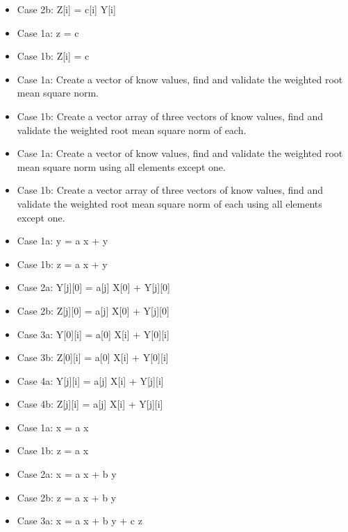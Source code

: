 \begin{itemize}
\item {} Case 2b: Z[i] = c[i] Y[i]
\item {} Case 1a: z = c
\item {} Case 1b: Z[i] = c
\item {} Case 1a: Create a vector of know values, find and validate the weighted root mean square norm.
\item {} Case 1b: Create a vector array of three vectors of know values, find and validate the weighted root mean square norm of each.
\item {} Case 1a: Create a vector of know values, find and validate the weighted root mean square norm using all elements except one.
\item {} Case 1b: Create a vector array of three vectors of know values, find and validate the weighted root mean square norm of each using all elements except one.
\item {} Case 1a: y = a x + y
\item {} Case 1b: z = a x + y
\item {} Case 2a: Y[j][0] = a[j] X[0] + Y[j][0]
\item {} Case 2b: Z[j][0] = a[j] X[0] + Y[j][0]
\item {} Case 3a: Y[0][i] = a[0] X[i] + Y[0][i]
\item {} Case 3b: Z[0][i] = a[0] X[i] + Y[0][i]
\item {} Case 4a: Y[j][i] = a[j] X[i] + Y[j][i]
\item {} Case 4b: Z[j][i] = a[j] X[i] + Y[j][i]
\item {} Case 1a: x = a x
\item {} Case 1b: z = a x
\item {} Case 2a: x = a x + b y
\item {} Case 2b: z = a x + b y
\item {} Case 3a: x = a x + b y + c z

\end{itemize}
